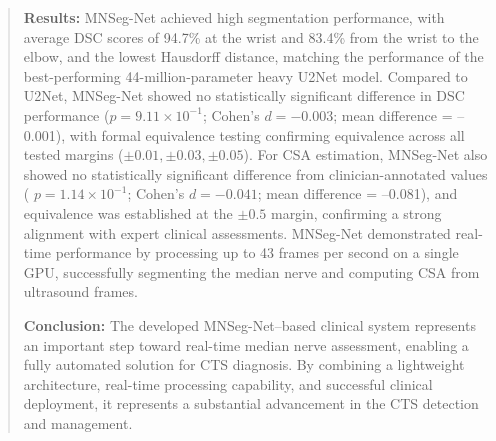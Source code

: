 \begin{abstract}
\noindent \textbf{Results:}  
MNSeg-Net achieved high segmentation performance, with average DSC scores of 94.7\% at the wrist and 83.4\% from the wrist to the elbow, and the lowest Hausdorff distance, matching the performance of the best-performing 44-million-parameter heavy U2Net model. Compared to U2Net, MNSeg-Net showed no statistically significant difference in DSC performance ($p = 9.11 \times 10^{-1}$; Cohen’s $d = -0.003$; mean difference = –0.001), with formal equivalence testing confirming equivalence across all tested margins ($\pm0.01, \pm0.03, \pm0.05$). For CSA estimation, MNSeg-Net also showed no statistically significant difference from clinician-annotated values ( $p = 1.14 \times 10^{-1}$; Cohen’s $d = -0.041$; mean difference = –0.081), and equivalence was established at the $\pm0.5$ margin, confirming a strong alignment with expert clinical assessments. MNSeg-Net demonstrated real-time performance by processing up to 43 frames per second on a single GPU, successfully segmenting the median nerve and computing CSA from ultrasound frames.


\noindent
\textbf{Conclusion:} The developed MNSeg-Net–based clinical system represents an important step toward real-time median nerve assessment, enabling a fully automated solution for CTS diagnosis. By combining a lightweight architecture, real-time processing capability, and successful clinical deployment, it represents a substantial advancement in the CTS detection and management.

\end{abstract}





